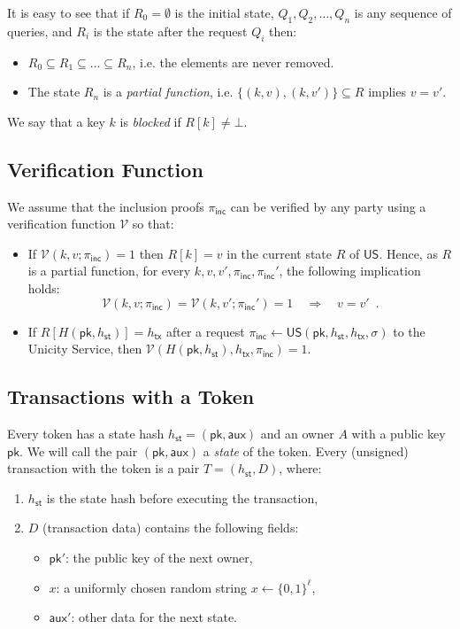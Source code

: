 \documentclass{article}
\newcommand{\pubkey}[0]{\mathsf{pk}}
\newcommand{\unisrv}[0]{\mathsf{US}}
\newcommand{\sthash}[0]{h_\mathsf{st}}
\newcommand{\txhash}[0]{h_\mathsf{tx}}
\newcommand{\auxd}[0]{\mathsf{aux}}
\newcommand{\univer}[0]{\mathcal{V}}
\newcommand{\pinc}[0]{\pi_{\mathsf{inc}}}
\begin{document}
\noindent It is easy to see that if $R_0 = \emptyset$ is the initial state, $Q_1, Q_2, \ldots, Q_n$ is any sequence of queries, and $R_i$ is the state after the request $Q_i$ then:
\begin{itemize}
\item $R_0 \subseteq R_1 \subseteq \ldots \subseteq R_n$, i.e. the elements are never removed.
\item The state $R_n$ is a \emph{partial function}, i.e.
$\{(k, v), (k, v')\} \subseteq R$ implies $v = v'$.
\end{itemize}

We say that a key $k$ is \emph{blocked} if $R[k] \neq \bot$.

\subsection{Verification Function}

We assume that the inclusion proofs $\pinc$ can be verified by any party using a verification function $\univer$ so that:
\begin{itemize}
\item If $\univer(k, v; \pinc) = 1$ then $R[k] = v$ in the current state $R$ of $\unisrv$. Hence, as $R$ is a partial function, for every $k, v, v', \pinc, \pinc'$, the following implication holds:
\begin{equation}\label{eq:eqtx}
\univer(k, v; \pinc) = \univer(k, v'; \pinc') = 1 \quad \Rightarrow \quad v =v' \enspace.
\end{equation}
\item If $R[H(\pubkey, \sthash)] = \txhash$ after a request $\pinc \gets \unisrv(\pubkey, \sthash, \txhash, \sigma)$ to the Unicity Service, then $\univer(H(\pubkey, \sthash), \txhash, \pinc) = 1$.
\end{itemize}

\subsection{Transactions with a Token}

Every token has a state hash $\sthash = (\pubkey, \auxd)$ and an owner $A$ with a public key $\pubkey$. We will call the pair $(\pubkey, \auxd)$ a \emph{state} of the token.
Every (unsigned) transaction with the token is a pair
$T = (\sthash, D)$, where:
\begin{enumerate}
\item $\sthash$ is the state hash before executing the transaction,
\item $D$ (transaction data) contains the following fields:
\begin{itemize}
\item $\pubkey'$: the public key of the next owner,
\item $x$: a uniformly chosen random string $x\gets\{0,1\}^\ell$,
\item $\auxd'$: other data for the next state.
\end{itemize}
\end{enumerate}
\end{document}
